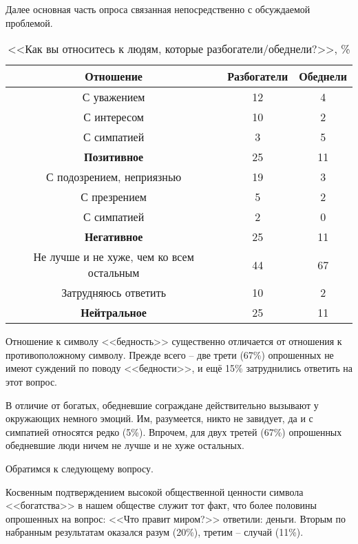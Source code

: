 Далее основная часть опроса связанная непосредственно с обсуждаемой проблемой.
\begin{table}[H]
    \centering
    \begin{tabular}{|c|c|c|}
        \hline
        Отношение & Разбогатели & Обеднели \\ \hline \hline
        С уважением & 12 & 4 \\ \hline
        С интересом & 10 & 2 \\ \hline
        С симпатией & 3 & 5 \\ \hline
        \textbf{Позитивное} & 25 & 11 \\ \hline \hline
        С подозрением, неприязнью & 19 & 3 \\ \hline
        С презрением & 5 & 2 \\ \hline
        С симпатией & 2 & 0 \\ \hline
        \textbf{Негативное} & 25 & 11 \\ \hline \hline
        Не лучше и не хуже, чем ко всем остальным & 44 & 67 \\ \hline
        Затрудняюсь ответить & 10 & 2 \\ \hline
        \textbf{Нейтральное} & 25 & 11 \\ \hline
    \end{tabular}
    \caption{<<Как вы относитесь к людям, которые разбогатели/обеднели?>>, \%}
\end{table}

Отношение к символу <<бедность>> существенно отличается от отношения к 
противоположному символу. Прежде всего -- две трети (67\%) опрошенных не 
имеют суждений по поводу <<бедности>>, и ещё 15\% затруднились ответить на 
этот вопрос. 

В отличие от богатых, обедневшие сограждане действительно вызывают у 
окружающих немного эмоций. Им, разумеется, никто не завидует, да и с симпатией 
относятся редко (5\%). Впрочем, для двух третей (67\%) опрошенных обедневшие 
люди ничем не лучше и не хуже остальных. 

Обратимся к следующему вопросу. 

Косвенным подтверждением высокой общественной ценности символа <<богатства>> в 
нашем обществе служит тот факт, что более половины опрошенных на вопрос: 
<<Что правит миром?>> ответили: деньги. Вторым по набранным результатам 
оказался разум (20\%), третим -- случай (11\%).

